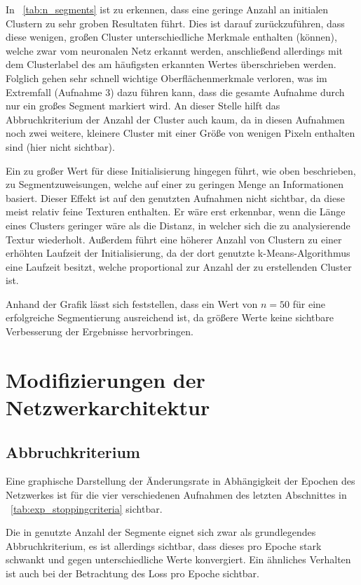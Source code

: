 In \tablename~\ref{tab:n_segments} ist zu erkennen, dass eine geringe Anzahl an initialen Clustern zu sehr groben Resultaten führt. Dies ist darauf zurückzuführen, dass diese wenigen, großen Cluster unterschiedliche Merkmale enthalten (können), welche zwar vom neuronalen Netz erkannt werden, anschließend allerdings mit dem Clusterlabel des am häufigsten erkannten Wertes überschrieben werden. Folglich gehen sehr schnell wichtige Oberflächenmerkmale verloren, was im Extremfall (\vgl Aufnahme 3) dazu führen kann, dass die gesamte Aufnahme durch nur ein großes Segment markiert wird. An dieser Stelle hilft das Abbruchkriterium der Anzahl der Cluster auch kaum, da in diesen Aufnahmen noch zwei weitere, kleinere Cluster mit einer Größe von wenigen Pixeln enthalten sind (hier nicht sichtbar).

Ein zu großer Wert für diese Initialisierung hingegen führt, wie oben beschrieben, zu Segmentzuweisungen, welche auf einer zu geringen Menge an Informationen basiert. Dieser Effekt ist auf den genutzten Aufnahmen nicht sichtbar, da diese meist relativ feine Texturen enthalten. Er wäre erst erkennbar, wenn die Länge eines Clusters geringer wäre als die Distanz, in welcher sich die zu analysierende Textur wiederholt. Außerdem führt eine höherer Anzahl von Clustern zu einer erhöhten Laufzeit der Initialisierung, da der dort genutzte k-Means-Algorithmus eine Laufzeit besitzt, welche proportional zur Anzahl der zu erstellenden Cluster ist.

Anhand der Grafik lässt sich feststellen, dass ein Wert von $n=50$ für eine erfolgreiche Segmentierung ausreichend ist, da größere Werte keine sichtbare Verbesserung der Ergebnisse hervorbringen.

\section{Modifizierungen der Netzwerkarchitektur}
\label{sec:modifications_arch}

\subsection{Abbruchkriterium}
\label{ssec:exp_stoppingcriteria}

Eine graphische Darstellung der Änderungsrate in Abhängigkeit der Epochen des Netzwerkes ist für die vier verschiedenen Aufnahmen des letzten Abschnittes in \tablename~\ref{tab:exp_stoppingcriteria} sichtbar.

Die in \cite{kanezaki_18} genutzte Anzahl der Segmente eignet sich zwar als grundlegendes Abbruchkriterium, es ist allerdings sichtbar, dass dieses pro Epoche stark schwankt und gegen unterschiedliche Werte konvergiert. Ein ähnliches Verhalten ist auch bei der Betrachtung des Loss pro Epoche sichtbar.

